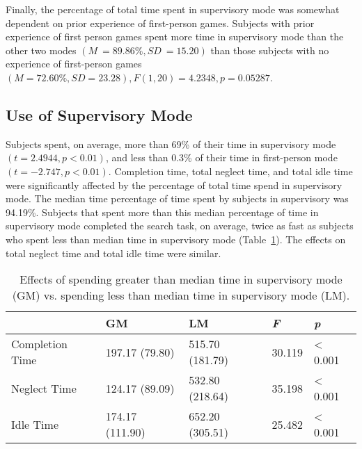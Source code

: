 Finally, the percentage of total time spent in supervisory mode was somewhat dependent on prior experience of first-person games. Subjects with prior experience of first person games spent more time in supervisory mode than the other two modes $(M~=89.86\%, SD~=15.20)$ than those subjects with no experience of first-person games $(M=72.60\%, SD=23.28), F(1,20)=4.2348, p=0.05287$.


\subsection{Use of Supervisory Mode} %
\label{sub:use_of_supervisory_mode}

Subjects spent, on average, more than 69\% of their time in supervisory mode $(t = 2.4944, p < 0.01)$, and less than 0.3\% of their time in first-person mode $(t = -2.747, p < 0.01)$.
Completion time, total neglect time, and total idle time were significantly affected by the percentage of total time spend in supervisory mode. The median time percentage of time spent by subjects in supervisory was 94.19\%. Subjects that spent more than this median percentage of time in supervisory mode completed the search task, on average, twice as fast as subjects who spent less than median time in supervisory mode (Table~\ref{tab:supervisory}). The effects on total neglect time and total idle time were similar.


\begin{table}[ht]
\label{tab:supervisory}
\begin{center}
	\begin{tabular}{| l | l | l | l | l |}
	\hline
		& \textbf{GM} & \textbf{LM} & \emph{F} & \emph{p}\\ \hline
		Completion Time & 197.17 (79.80) & 515.70 (181.79) & 30.119 & < 0.001\\ \hline
		Neglect Time & 124.17 (89.09) & 532.80 (218.64) & 35.198 & < 0.001\\ \hline
		Idle Time & 174.17 (111.90) & 652.20 (305.51) & 25.482 & < 0.001\\ \hline
	\hline
	\end{tabular}
	\caption{Effects of spending greater than median time in supervisory mode (GM) vs. spending less than median time in supervisory mode (LM).}
\end{center}
\end{table}

